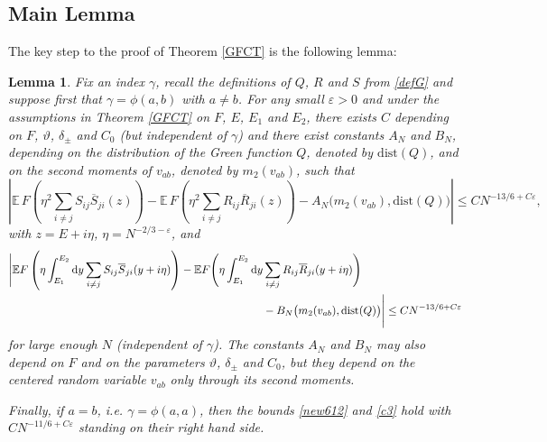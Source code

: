 \documentclass[draft]{article}
\newcommand{\ttau}{\vartheta}
\newcommand{\e}{\varepsilon}
\newcommand{\rd}{{\rm d}}
\newcommand{\non}{\nonumber}
\newcommand{\be}{\begin{equation}}
\newcommand{\ee}{\end{equation}}
\newcommand{\E}{{\mathbb E }}
\newtheorem{lemma}[theorem]{Lemma}
\numberwithin{equation}{section}
\numberwithin{theorem}{section}
\numberwithin{definition}{section}
\numberwithin{remark}{section}
\begin{document}
\subsection{Main Lemma}\label{sec:mainlemma}

The key step to the proof of Theorem \ref{GFCT} is the following lemma:


\begin{lemma}\label{lemGamma} Fix an index $\gamma$,
 recall the definitions of $Q$, $R$ and $S$ 
from \eqref{defG} and suppose first that  $\gamma =\phi(a,b)$
with $a\ne b$. For any small $\e>0$ and
under the assumptions in Theorem \ref{GFCT} on $F$, $E$,
$E_{1}$ and $E_2$,   there exists $C$ depending 
on $F$,  $\ttau$, $\delta_\pm$ and $C_0$ (but independent of $\gamma$) and
there exist  constants $A_N$ and $B_N$, depending  on the distribution of the Green function $Q$,
denoted by $\mbox{dist}(Q)$, 
and on the second moments of
 $v_{ab}$, denoted by $m_{2}(v_{ab})$, such that
\be\label{new612}
\left|\E \, F \left (\eta^2 \sum_{i\neq j}S_{ij}\overline{S}_{ji}(z) \right ) -
\E \, F \left (\eta^2 \sum_{i\neq j}R_{ij}\overline{R}_{ji}(z) \right )-
 A_N\big(m_2(v_{ab}), \mbox{dist}(Q)\big)\right|\leq CN^{-13/6+C\e},\;
\ee
with $z=E+i\eta$, $\eta=N^{-2/3-\e}$, and
\begin{align}\label{c3} 
\Bigg|\E  F\left( \eta  \int_{E_1}^{E_2} \rd y  
\sum_{i\neq j}S_{ij}\overline{S}_{ji}(y+i\eta)\right)
-\E  F\Bigg( \eta  \int_{E_1}^{E_2} \rd y  & \sum_{i\neq j}R_{ij}\overline{R}_{ji}(y+i\eta)\Bigg)
 \\ & -B_N\big(m_2(v_{ab}), \mbox{dist}(Q) \big)  \Bigg|\leq CN^{-13/6+C\e}\non
\end{align}
for large enough $N$ (independent of $\gamma$). The constants $A_N$ and $B_N$ may also depend 
on $F$ and on the parameters  $\ttau$, $\delta_\pm$ and $C_0$, but they depend on 
the centered random variable $v_{ab}$ only through its second moments.

Finally, if $a=b$, i.e. $\gamma =\phi(a,a)$, then the bounds \eqref{new612} and \eqref{c3} hold
with $CN^{-11/6+C\e}$ standing on their right hand side.
\end{lemma}

\bigskip
\end{document}
